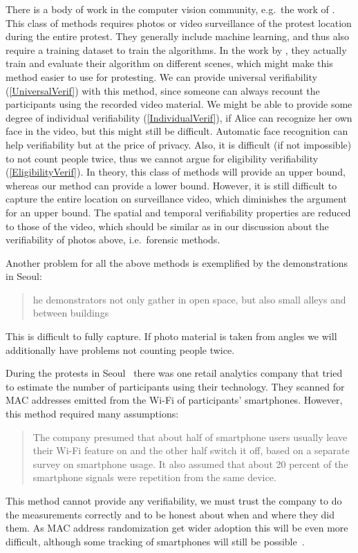 There is a body of work in the computer vision community, e.g.\ the work of 
\citet{NNCrowdCounting}.
This class of methods requires photos or video surveillance of the protest 
location during the entire protest.
They generally include machine learning, and thus also require a training 
dataset to train the algorithms.
In the work by \citet{NNCrowdCounting}, they actually train and evaluate their 
algorithm on different scenes, which might make this method easier to use for 
protesting.
We can provide universal verifiability (\cref{UniversalVerif}) with this 
method, since someone can always recount the participants using the recorded 
video material.
We might be able to provide some degree of individual verifiability 
(\cref{IndividualVerif}), if Alice can recognize her own face in the video, but 
this might still be difficult. Automatic face recognition can help
verifiability but at the price of privacy.
Also, it is difficult (if not impossible) to not count people twice, thus we 
cannot argue for eligibility verifiability (\cref{EligibilityVerif}).
In theory, this class of methods will provide an upper bound, whereas our method 
can provide a lower bound.
However, it is still difficult to capture the entire location on surveillance 
video, which diminishes the argument for an upper bound.
The spatial and temporal verifiability properties are reduced to those of the 
video, which should be similar as in our discussion about the verifiability of 
photos above, i.e.\ forensic methods.

Another problem for all the above methods is exemplified by the demonstrations 
in Seoul:
\blockcquote{2016DemonstrationsInSeoul}{%
  he demonstrators not only gather in open space, but also small 
  alleys and between buildings%
}.
This is difficult to fully capture.
If photo material is taken from angles we will additionally have problems not 
counting people twice.

During the protests in Seoul~\cite{2016DemonstrationsInSeoul} there was one 
retail analytics company that tried to estimate the number of participants using 
their technology.
They scanned for MAC addresses emitted from the Wi-Fi of participants' 
smartphones.
However, this method required many assumptions:
\blockcquote{2016DemonstrationsInSeoul}{%
  The company presumed that about half of smartphone users usually leave their 
  Wi-Fi feature on and the other half switch it off, based on a separate survey 
  on smartphone usage. It also assumed that about 20 percent of the smartphone 
  signals were repetition from the same device.
}
This method cannot provide any verifiability, we must trust the company to do 
the measurements correctly and to be honest about when and where they did them.
As MAC address randomization get wider adoption this will be even more 
difficult, although some tracking of smartphones will still be 
possible~\cite{WhyMACRandomizationIsNotEnough}.

